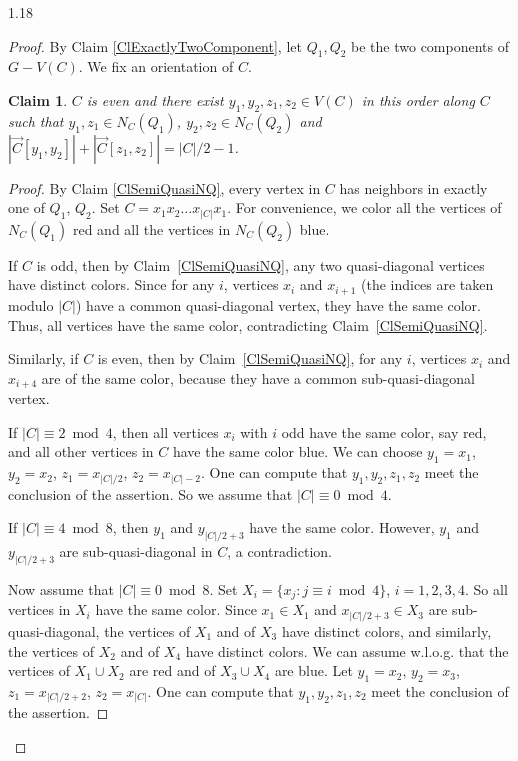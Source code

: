 \documentclass[10pt]{article}
\newtheorem{claim}{Claim}
\begin{document}
\begin{spacing}{1.18}
\begin{proof}
By Claim \ref{ClExactlyTwoComponent}, let $Q_1,Q_2$ be the two components of $G-V(C)$. We fix an orientation of $C$. 

\begin{claim}\label{Clx1x2y1y2}
    $C$ is even and there exist $y_1,y_2,z_1,z_2\in V(C)$ in this order along $C$ such that $y_1,z_1\in N_C(Q_1)$, $y_2,z_2\in N_C(Q_2)$ and $|\overrightarrow{C}[y_1,y_2]|+|\overrightarrow{C}[z_1,z_2]|=|C|/2-1$.
\end{claim}

\begin{proof}
    By Claim \ref{ClSemiQuasiNQ}, every vertex in $C$ has neighbors in exactly one of $Q_1$, $Q_2$. Set $C=x_1x_2\ldots x_{|C|}x_1$. For convenience, we color all the vertices of $N_C(Q_1)$ red and all the vertices in $N_C(Q_2)$ blue. 
    
    If $C$ is odd, then by Claim~\ref{ClSemiQuasiNQ}, any two quasi-diagonal vertices have distinct colors. Since for any $i$, vertices $x_i$ and $x_{i+1}$ (the indices are taken modulo $|C|$) have a common quasi-diagonal vertex, they have the same color. Thus, all vertices have the same color, contradicting Claim~\ref{ClSemiQuasiNQ}. 
    
    Similarly, if $C$ is even, then by Claim~\ref{ClSemiQuasiNQ}, for any $i$, vertices $x_i$ and $x_{i+4}$ are of the same color, because they have a common sub-quasi-diagonal vertex. 

    If $|C|\equiv 2\bmod 4$, then all vertices $x_i$ with $i$ odd have the same color, say red, and all other vertices in $C$ have the same color blue. We can choose $y_1=x_1$, $y_2=x_2$, $z_1=x_{|C|/2}$, $z_2=x_{|C|-2}$. One can compute that $y_1,y_2,z_1,z_2$ meet the conclusion of the assertion. So we assume that $|C|\equiv 0\bmod 4$.

    If $|C|\equiv 4\bmod 8$, then $y_1$ and $y_{|C|/2+3}$ have the same color. However, $y_1$ and $y_{|C|/2+3}$ are sub-quasi-diagonal in $C$, a contradiction.

    Now assume that $|C|\equiv 0\bmod 8$. Set $X_i=\{x_j: j\equiv i\bmod 4\}$, $i=1,2,3,4$. So all vertices in $X_i$ have the same color. Since $x_1\in X_1$ and $x_{|C|/2+3}\in X_3$ are sub-quasi-diagonal, the vertices of $X_1$ and of $X_3$ have distinct colors, and similarly, the vertices of $X_2$ and of $X_4$ have distinct colors. We can assume w.l.o.g. that the vertices of $X_1\cup X_2$ are red and of $X_3\cup X_4$ are blue. Let $y_1=x_2$, $y_2=x_3$, $z_1=x_{|C|/2+2}$, $z_2=x_{|C|}$. One can compute that $y_1,y_2,z_1,z_2$ meet the conclusion of the assertion. 
\end{proof}


\end{proof}
\end{spacing}
\end{document}
